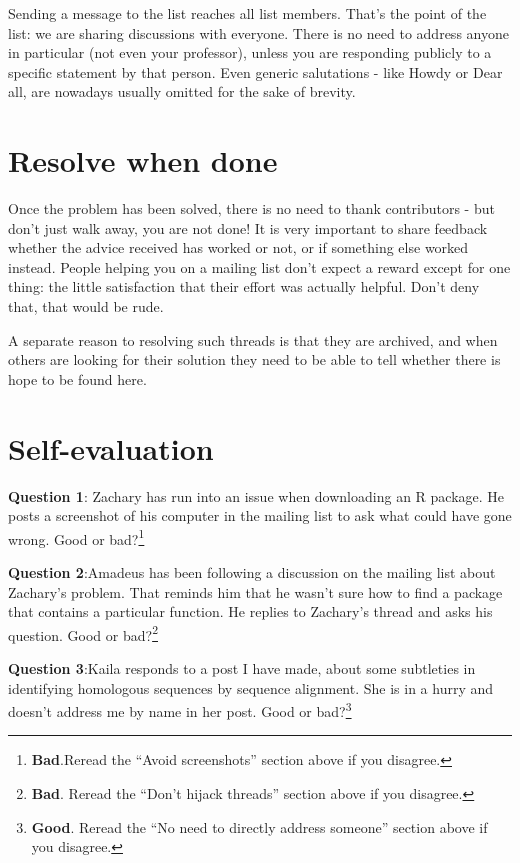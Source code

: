 \documentclass[]{book}
\let\rmarkdownfootnote\footnote%
\def\footnote{\protect\rmarkdownfootnote}
\begin{document}
Sending a message to the list reaches all list members. That's the point
of the list: we are sharing discussions with everyone. There is no need
to address anyone in particular (not even your professor), unless you
are responding publicly to a specific statement by that person. Even
generic salutations - like Howdy or Dear all, are nowadays usually
omitted for the sake of brevity.

\section{Resolve when done}\label{resolve-when-done}

Once the problem has been solved, there is no need to thank contributors
- but don't just walk away, you are not done! It is very important to
share feedback whether the advice received has worked or not, or if
something else worked instead. People helping you on a mailing list
don't expect a reward except for one thing: the little satisfaction that
their effort was actually helpful. Don't deny that, that would be rude.

A separate reason to resolving such threads is that they are archived,
and when others are looking for their solution they need to be able to
tell whether there is hope to be found here.

\section{Self-evaluation}\label{self-evaluation-4}

\textbf{Question 1}: Zachary has run into an issue when downloading an R
package. He posts a screenshot of his computer in the mailing list to
ask what could have gone wrong. Good or bad?\footnote{\textbf{Bad}.Reread
  the ``Avoid screenshots'' section above if you disagree.}

\textbf{Question 2}:Amadeus has been following a discussion on the
mailing list about Zachary's problem. That reminds him that he wasn't
sure how to find a package that contains a particular function. He
replies to Zachary's thread and asks his question. Good or
bad?\footnote{\textbf{Bad}. Reread the ``Don't hijack threads'' section
  above if you disagree.}

\textbf{Question 3}:Kaila responds to a post I have made, about some
subtleties in identifying homologous sequences by sequence alignment.
She is in a hurry and doesn't address me by name in her post. Good or
bad?\footnote{\textbf{Good}. Reread the ``No need to directly address
  someone'' section above if you disagree.}
\end{document}
